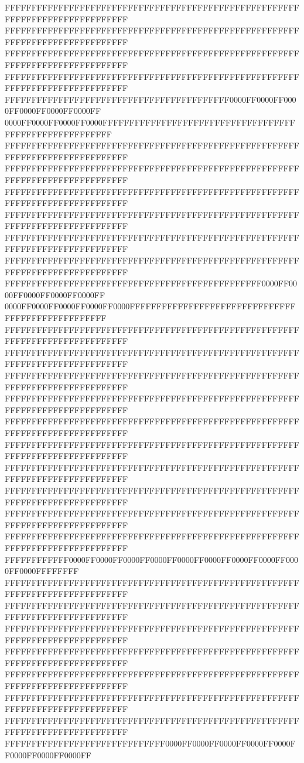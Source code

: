 FFFFFFFFFFFFFFFFFFFFFFFFFFFFFFFFFFFFFFFFFFFFFFFFFFFFFFFFFFFFFFFFFFFFFFFFFFFFFF
FFFFFFFFFFFFFFFFFFFFFFFFFFFFFFFFFFFFFFFFFFFFFFFFFFFFFFFFFFFFFFFFFFFFFFFFFFFFFF
FFFFFFFFFFFFFFFFFFFFFFFFFFFFFFFFFFFFFFFFFFFFFFFFFFFFFFFFFFFFFFFFFFFFFFFFFFFFFF
FFFFFFFFFFFFFFFFFFFFFFFFFFFFFFFFFFFFFFFFFFFFFFFFFFFFFFFFFFFFFFFFFFFFFFFFFFFFFF
FFFFFFFFFFFFFFFFFFFFFFFFFFFFFFFFFFFFFFFFFF0000FF0000FF0000FF0000FF0000FF0000FF
0000FF0000FF0000FF0000FFFFFFFFFFFFFFFFFFFFFFFFFFFFFFFFFFFFFFFFFFFFFFFFFFFFFFFF
FFFFFFFFFFFFFFFFFFFFFFFFFFFFFFFFFFFFFFFFFFFFFFFFFFFFFFFFFFFFFFFFFFFFFFFFFFFFFF
FFFFFFFFFFFFFFFFFFFFFFFFFFFFFFFFFFFFFFFFFFFFFFFFFFFFFFFFFFFFFFFFFFFFFFFFFFFFFF
FFFFFFFFFFFFFFFFFFFFFFFFFFFFFFFFFFFFFFFFFFFFFFFFFFFFFFFFFFFFFFFFFFFFFFFFFFFFFF
FFFFFFFFFFFFFFFFFFFFFFFFFFFFFFFFFFFFFFFFFFFFFFFFFFFFFFFFFFFFFFFFFFFFFFFFFFFFFF
FFFFFFFFFFFFFFFFFFFFFFFFFFFFFFFFFFFFFFFFFFFFFFFFFFFFFFFFFFFFFFFFFFFFFFFFFFFFFF
FFFFFFFFFFFFFFFFFFFFFFFFFFFFFFFFFFFFFFFFFFFFFFFFFFFFFFFFFFFFFFFFFFFFFFFFFFFFFF
FFFFFFFFFFFFFFFFFFFFFFFFFFFFFFFFFFFFFFFFFFFFFFFF0000FF0000FF0000FF0000FF0000FF
0000FF0000FF0000FF0000FF0000FFFFFFFFFFFFFFFFFFFFFFFFFFFFFFFFFFFFFFFFFFFFFFFFFF
FFFFFFFFFFFFFFFFFFFFFFFFFFFFFFFFFFFFFFFFFFFFFFFFFFFFFFFFFFFFFFFFFFFFFFFFFFFFFF
FFFFFFFFFFFFFFFFFFFFFFFFFFFFFFFFFFFFFFFFFFFFFFFFFFFFFFFFFFFFFFFFFFFFFFFFFFFFFF
FFFFFFFFFFFFFFFFFFFFFFFFFFFFFFFFFFFFFFFFFFFFFFFFFFFFFFFFFFFFFFFFFFFFFFFFFFFFFF
FFFFFFFFFFFFFFFFFFFFFFFFFFFFFFFFFFFFFFFFFFFFFFFFFFFFFFFFFFFFFFFFFFFFFFFFFFFFFF
FFFFFFFFFFFFFFFFFFFFFFFFFFFFFFFFFFFFFFFFFFFFFFFFFFFFFFFFFFFFFFFFFFFFFFFFFFFFFF
FFFFFFFFFFFFFFFFFFFFFFFFFFFFFFFFFFFFFFFFFFFFFFFFFFFFFFFFFFFFFFFFFFFFFFFFFFFFFF
FFFFFFFFFFFFFFFFFFFFFFFFFFFFFFFFFFFFFFFFFFFFFFFFFFFFFFFFFFFFFFFFFFFFFFFFFFFFFF
FFFFFFFFFFFFFFFFFFFFFFFFFFFFFFFFFFFFFFFFFFFFFFFFFFFFFFFFFFFFFFFFFFFFFFFFFFFFFF
FFFFFFFFFFFFFFFFFFFFFFFFFFFFFFFFFFFFFFFFFFFFFFFFFFFFFFFFFFFFFFFFFFFFFFFFFFFFFF
FFFFFFFFFFFFFFFFFFFFFFFFFFFFFFFFFFFFFFFFFFFFFFFFFFFFFFFFFFFFFFFFFFFFFFFFFFFFFF
FFFFFFFFFFFF0000FF0000FF0000FF0000FF0000FF0000FF0000FF0000FF0000FF0000FFFFFFFF
FFFFFFFFFFFFFFFFFFFFFFFFFFFFFFFFFFFFFFFFFFFFFFFFFFFFFFFFFFFFFFFFFFFFFFFFFFFFFF
FFFFFFFFFFFFFFFFFFFFFFFFFFFFFFFFFFFFFFFFFFFFFFFFFFFFFFFFFFFFFFFFFFFFFFFFFFFFFF
FFFFFFFFFFFFFFFFFFFFFFFFFFFFFFFFFFFFFFFFFFFFFFFFFFFFFFFFFFFFFFFFFFFFFFFFFFFFFF
FFFFFFFFFFFFFFFFFFFFFFFFFFFFFFFFFFFFFFFFFFFFFFFFFFFFFFFFFFFFFFFFFFFFFFFFFFFFFF
FFFFFFFFFFFFFFFFFFFFFFFFFFFFFFFFFFFFFFFFFFFFFFFFFFFFFFFFFFFFFFFFFFFFFFFFFFFFFF
FFFFFFFFFFFFFFFFFFFFFFFFFFFFFFFFFFFFFFFFFFFFFFFFFFFFFFFFFFFFFFFFFFFFFFFFFFFFFF
FFFFFFFFFFFFFFFFFFFFFFFFFFFFFFFFFFFFFFFFFFFFFFFFFFFFFFFFFFFFFFFFFFFFFFFFFFFFFF
FFFFFFFFFFFFFFFFFFFFFFFFFFFFFF0000FF0000FF0000FF0000FF0000FF0000FF0000FF0000FF
